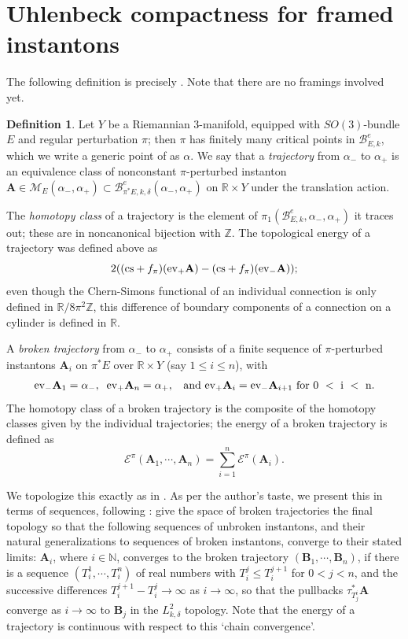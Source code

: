 \documentclass{memo-l}
\newcommand{\pE}{\pi^* \! E}
\theoremstyle{definition}
\newtheorem{definition}[theorem]{Definition}
\theoremstyle{remark}
\numberwithin{section}{chapter}
\numberwithin{equation}{chapter}
\begin{document}
\section{Uhlenbeck compactness for framed instantons}\label{sec:4d-compact}
The following definition is precisely \cite[Definition~16.1.1]{KMSW}. Note that there are no framings involved yet.

\begin{definition}Let $Y$ be a Riemannian 3-manifold, equipped with $SO(3)$-bundle $E$ and regular perturbation $\pi$; then $\pi$ has finitely many critical points in $\mathcal B^e_{E,k}$, which we write a generic point of as $\alpha$. We say that a \emph{trajectory} from $\alpha_-$ to $\alpha_+$ is an equivalence class of nonconstant $\pi$-perturbed instanton $\mathbf A \in \mathcal M_{E}(\alpha_-, \alpha_+) \subset \mathcal B^e_{\pE,k,\delta}(\alpha_-,\alpha_+)$ on $\mathbb R \times Y$ under the translation action. 

The \emph{homotopy class} of a trajectory is the element of $\pi_1(\mathcal B^e_{E,k}, \alpha_-, \alpha_+)$ it traces out; these are in noncanonical bijection with $\mathbb Z$. The topological energy of a trajectory was defined above as 
$$2((\textup{cs}+f_\pi)(\textup{ev}_+  \mathbf{A}) -  (\textup{cs} + f_\pi)(\textup{ev}_-\mathbf{A}));$$ 
even though the Chern-Simons functional of an individual connection is only defined in $\mathbb R/8\pi^2\mathbb Z$, this difference of boundary components of a connection on a cylinder is defined in $\mathbb R$.

A \emph{broken trajectory} from $\alpha_-$ to $\alpha_+$ consists of a finite sequence of $\pi$-perturbed instantons $\mathbf{A}_i$ on $\pE$ over $\mathbb R \times Y$ (say $1 \leq i \leq n$), with $$\textup{ev}_-\mathbf{A}_1 = \alpha_-, \; \; \textup{ev}_+ \mathbf{A}_n = \alpha_+, \;\; \text{ and } \textup{ev}_+ \mathbf{A}_i = \textup{ev}_- \mathbf{A}_{i+1} \text{  for 0 }< \text{ i } < \text{ n}.$$ The homotopy class of a broken trajectory is the composite of the homotopy classes given by the individual trajectories; the energy of a broken trajectory is defined as $$\mathcal E^\pi(\mathbf{A}_1, \cdots, \mathbf{A}_n) = \sum_{i=1}^n \mathcal E^\pi(\mathbf{A}_i).$$
\end{definition}

We topologize this exactly as in \cite[Page~276]{KMSW}. As per the author's taste, we present this in terms of sequences, following \cite[Page~116]{Don}: give the space of broken trajectories the final topology so that the following sequences of unbroken instantons, and their natural generalizations to sequences of broken instantons, converge to their stated limits: $\mathbf{A}_i$, where $i \in \mathbb N$, converges to the broken trajectory $(\mathbf{B}_1, \cdots, \mathbf{B}_n)$, if there is a sequence $(T_i^1, \cdots, T_i^n)$ of real numbers with $T_i^j \leq T_i^{j+1}$ for $0 < j < n$, and the successive differences $T^{j+1}_i - T^j_i \to \infty$ as $i \to \infty$, so that the pullbacks $\tau_{T^i_j}^* \mathbf{A}$ converge as $i \to \infty$ to $\mathbf{B}_j$ in the $L^2_{k,\delta}$ topology. Note that the energy of a trajectory is continuous with respect to this `chain convergence'. 
\end{document}
